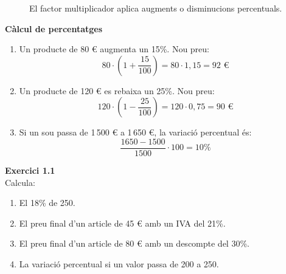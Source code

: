 \documentclass[12pt]{article}
\begin{document}
\begin{figure}[H]
\centering
{}
\caption{El factor multiplicador aplica augments o disminucions percentuals.}
\end{figure}

\begin{exemple}
\textbf{Càlcul de percentatges}
\begin{enumerate}[label=\alph*)]
    \item Un producte de 80 € augmenta un 15\%. Nou preu:
    \[
    80 \cdot \left(1 + \dfrac{15}{100}\right) = 80 \cdot 1{,}15 = 92 \text{ €}
    \]
    \item Un producte de 120 € es rebaixa un 25\%. Nou preu:
    \[
    120 \cdot \left(1 - \dfrac{25}{100}\right) = 120 \cdot 0{,}75 = 90 \text{ €}
    \]
    \item Si un sou passa de 1\,500 € a 1\,650 €, la variació percentual és:
    \[
    \dfrac{1650-1500}{1500} \cdot 100 = 10\%
    \]
\end{enumerate}
\end{exemple}

\begin{exercici}
\textbf{Exercici 1.1}\\
Calcula:
\begin{enumerate}[label=\alph*)]
    \item El 18\% de 250.
    \item El preu final d'un article de 45 € amb un IVA del 21\%.
    \item El preu final d'un article de 80 € amb un descompte del 30\%.
    \item La variació percentual si un valor passa de 200 a 250.
\end{enumerate}
\end{exercici}

\end{document}
